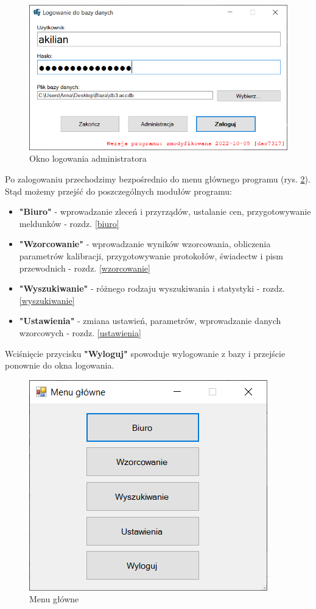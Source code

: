 \begin{figure}[htb]
	\centering
	\includegraphics{obrazki/Logowanie/logowanie_administracja.png}
	\caption{Okno logowania administratora}
	\label{oknoLogowaniaAdmina}
\end{figure}

Po zalogowaniu przechodzimy bezpośrednio do menu głównego programu (rys. \ref{menuGlowne}). Stąd możemy przejść do poszczególnych modułów programu:
\begin{itemize}
	\item \textbf{"Biuro"} - wprowadzanie zleceń i przyrządów, ustalanie cen, przygotowywanie meldunków - rozdz. \ref{biuro}
	\item \textbf{"Wzorcowanie"} - wprowadzanie wyników wzorcowania, obliczenia parametrów kalibracji, przygotowywanie protokołów, świadectw i pism przewodnich - rozdz. \ref{wzorcowanie}
	\item \textbf{"Wyszukiwanie"} - różnego rodzaju wyszukiwania i statystyki - rozdz. \ref{wyszukiwanie}
	\item \textbf{"Ustawienia"} - zmiana ustawień, parametrów, wprowadzanie danych wzorcowych - rozdz. \ref{ustawienia}
\end{itemize}

Wciśnięcie przycisku \textbf{"Wyloguj"} spowoduje wylogowanie z bazy i przejście ponownie do okna logowania.

\begin{figure}[htb]
	\centering
	\includegraphics{obrazki/Logowanie/menu_glowne.png}
	\caption{Menu główne}
	\label{menuGlowne}
\end{figure}

